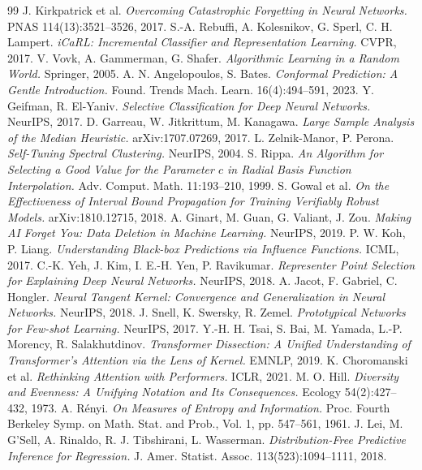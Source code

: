 \documentclass[10pt,twocolumn]{article}
\begin{document}
\begin{thebibliography}{99}
 J. Kirkpatrick et al. \emph{Overcoming Catastrophic Forgetting in Neural Networks.} PNAS 114(13):3521--3526, 2017.
 S.-A. Rebuffi, A. Kolesnikov, G. Sperl, C. H. Lampert. \emph{iCaRL: Incremental Classifier and Representation Learning.} CVPR, 2017.
 V. Vovk, A. Gammerman, G. Shafer. \emph{Algorithmic Learning in a Random World.} Springer, 2005.
 A. N. Angelopoulos, S. Bates. \emph{Conformal Prediction: A Gentle Introduction.} Found. Trends Mach. Learn. 16(4):494--591, 2023.
 Y. Geifman, R. El-Yaniv. \emph{Selective Classification for Deep Neural Networks.} NeurIPS, 2017.
 D. Garreau, W. Jitkrittum, M. Kanagawa. \emph{Large Sample Analysis of the Median Heuristic.} arXiv:1707.07269, 2017.
 L. Zelnik-Manor, P. Perona. \emph{Self-Tuning Spectral Clustering.} NeurIPS, 2004.
 S. Rippa. \emph{An Algorithm for Selecting a Good Value for the Parameter $c$ in Radial Basis Function Interpolation.} Adv. Comput. Math. 11:193--210, 1999.
 S. Gowal et al. \emph{On the Effectiveness of Interval Bound Propagation for Training Verifiably Robust Models.} arXiv:1810.12715, 2018.
 A. Ginart, M. Guan, G. Valiant, J. Zou. \emph{Making AI Forget You: Data Deletion in Machine Learning.} NeurIPS, 2019.
 P. W. Koh, P. Liang. \emph{Understanding Black-box Predictions via Influence Functions.} ICML, 2017.
 C.-K. Yeh, J. Kim, I. E.-H. Yen, P. Ravikumar. \emph{Representer Point Selection for Explaining Deep Neural Networks.} NeurIPS, 2018.
 A. Jacot, F. Gabriel, C. Hongler. \emph{Neural Tangent Kernel: Convergence and Generalization in Neural Networks.} NeurIPS, 2018.
 J. Snell, K. Swersky, R. Zemel. \emph{Prototypical Networks for Few-shot Learning.} NeurIPS, 2017.
 Y.-H. H. Tsai, S. Bai, M. Yamada, L.-P. Morency, R. Salakhutdinov. \emph{Transformer Dissection: A Unified Understanding of Transformer's Attention via the Lens of Kernel.} EMNLP, 2019.
 K. Choromanski et al. \emph{Rethinking Attention with Performers.} ICLR, 2021.
 M. O. Hill. \emph{Diversity and Evenness: A Unifying Notation and Its Consequences.} Ecology 54(2):427--432, 1973.
 A. Rényi. \emph{On Measures of Entropy and Information.} Proc. Fourth Berkeley Symp. on Math. Stat. and Prob., Vol. 1, pp. 547--561, 1961.
 J. Lei, M. G'Sell, A. Rinaldo, R. J. Tibshirani, L. Wasserman. \emph{Distribution-Free Predictive Inference for Regression.} J. Amer. Statist. Assoc. 113(523):1094--1111, 2018.

\end{thebibliography}
\end{document}
